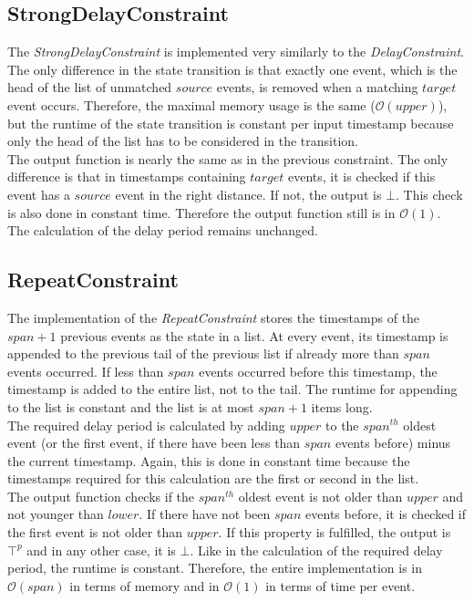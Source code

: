 \subsection{StrongDelayConstraint}
	The \emph{StrongDelayConstraint} is implemented very similarly to the \emph{DelayConstraint}. The only difference in the state transition is that exactly one event, which is the head of the list of unmatched $source$ events, is removed when a matching $target$ event occurs. Therefore, the maximal memory usage is the same ($\mathcal{O}(upper)$), but the runtime of the state transition is constant per input timestamp because only the head of the list has to be considered in the transition.\\
	The output function is nearly the same as in the previous constraint. The only difference is that in timestamps containing $target$ events, it is checked if this event has a $source$ event in the right distance. If not, the output is $\bot$. This check is also done in constant time. Therefore the output function still is in $\mathcal{O}(1)$. The calculation of the delay period remains unchanged.
	
\subsection{RepeatConstraint}
	The implementation of the \emph{RepeatConstraint} stores the timestamps of the $span+1$ previous events as the state in a list. At every event, its timestamp is appended to the previous tail of the previous list if already more than $span$ events occurred. If less than $span$ events occurred before this timestamp, the timestamp is added to the entire list, not to the tail. The runtime for appending to the list is constant and the list is at most $span+1$ items long.\\
	The required delay period is calculated by adding $upper$ to the  $span^{th}$ oldest event (or the first event, if there have been less than $span$ events before) minus the current timestamp. Again, this is done in constant time because the timestamps required for this calculation are the first or second in the list.\\
	The output function checks if the $span^{th}$ oldest event is not older than $upper$ and not younger than $lower$. If there have not been $span$ events before, it is checked if the first event is not older than $upper$. If this property is fulfilled, the output is $\top^p$ and in any other case, it is $\bot$. Like in the calculation of the required delay period, the runtime is constant. Therefore, the entire implementation is in $\mathcal{O}(span)$ in terms of memory and in $\mathcal{O}(1)$ in terms of time per event.
	
